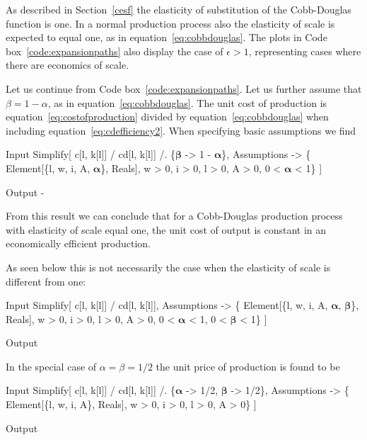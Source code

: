 \documentclass[11pt,fleqn]{book} %
\begin{document}
As described in Section~\ref{cesf} the elasticity of substitution of the Cobb-Douglas function is one. In a normal production process also the elasticity of scale is expected to equal one, as in equation~\ref{eq:cobbdouglas}. The plots in Code box~\ref{code:expansionpaths} also display the case of $\epsilon > 1$, representing cases where there are economics of scale.

\begin{theorem}
\hfill \break
Let us continue from Code box~\ref{code:expansionpaths}. Let us further assume that $\beta = 1 - \alpha$, as in equation~\ref{eq:cobbdouglas}. The unit cost of production is equation~\ref{eq:costofproduction} divided by equation~\ref{eq:cobbdouglas} when including equation~\ref{eq:cdefficiency2}. When specifying basic assumptions we find
\begin{mmaCell}{Input}
  Simplify[
    c[l, k[l]] / cd[l, k[l]] /. \{\(\pmb{\beta}\) -> 1 - \(\pmb{\alpha}\)\}, 
    Assumptions -> \{
      Element[\{l, w, i, A, \(\pmb{\alpha}\)\}, Reals], 
        w > 0, i > 0, l > 0, A > 0, 0 < \(\pmb{\alpha}\) < 1\}
    ]
\end{mmaCell}
\begin{mmaCell}{Output}
  -
\end{mmaCell}
From this result we can conclude that for a Cobb-Douglas production process with elasticity of scale equal one, the unit cost of output is constant in an economically efficient production.

As seen below this is not necessarily the case when the elasticity of scale is different from one:
\begin{mmaCell}{Input}
  Simplify[
    c[l, k[l]] / cd[l, k[l]], 
    Assumptions -> \{
      Element[\{l, w, i, A, \(\pmb{\alpha}\), \(\pmb{\beta}\)\}, Reals],
        w > 0, i > 0, l > 0, A > 0, 0 < \(\pmb{\alpha}\) < 1, 0 < \(\pmb{\beta}\) < 1\}
    ]
\end{mmaCell}
\begin{mmaCell}{Output}
\end{mmaCell}
In the special case of $\alpha = \beta = 1/2$ the unit price of production is found to be
\begin{mmaCell}{Input}
  Simplify[
    c[l, k[l]] / cd[l, k[l]] /. \{\(\pmb{\alpha}\) -> 1/2, \(\pmb{\beta}\) -> 1/2\}, 
    Assumptions -> \{
      Element[\{l, w, i, A\}, Reals], w > 0, i > 0, l > 0, A > 0\}
  ]
\end{mmaCell}
\begin{mmaCell}{Output}
\end{mmaCell}
\label{code:unitcost}
\end{theorem}
\end{document}
